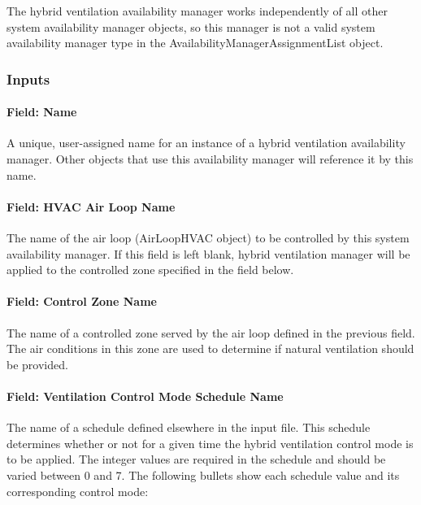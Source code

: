 The hybrid ventilation availability manager works independently of all other system availability manager objects, so this manager is not a valid system availability manager type in the AvailabilityManagerAssignmentList object.

\subsubsection{Inputs}\label{inputs-10-021}

\paragraph{Field: Name}\label{field-name-9-018}

A unique, user-assigned name for an instance of a hybrid ventilation availability manager. Other objects that use this availability manager will reference it by this name.

\paragraph{Field: HVAC Air Loop Name}\label{field-hvac-air-loop-name-000}

The name of the air loop (AirLoopHVAC object) to be controlled by this system availability manager. If this field is left blank, hybrid ventilation manager will be applied to the controlled zone specified in the field below.

\paragraph{Field: Control Zone Name}\label{field-controlled-zone-name}

The name of a controlled zone served by the air loop defined in the previous field. The air conditions in this zone are used to determine if natural ventilation should be provided.

\paragraph{Field: Ventilation Control Mode Schedule Name}\label{field-ventilation-control-mode-schedule-name}

The name of a schedule defined elsewhere in the input file. This schedule determines whether or not for a given time the hybrid ventilation control mode is to be applied. The integer values are required in the schedule and should be varied between 0 and 7. The following bullets show each schedule value and its corresponding control mode:

